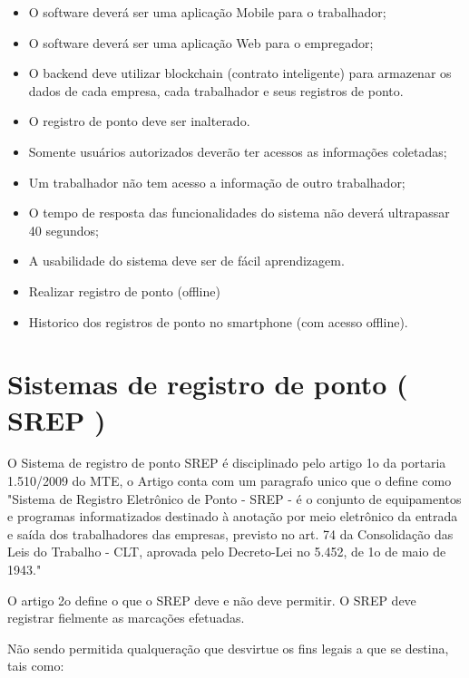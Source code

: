 \documentclass[12pt,openright,twoside,a4paper,english, brazil]{abntex2} %
\begin{document}
\begin{itemize}
	\item O software deverá ser uma aplicação Mobile para o trabalhador;
	\item O software deverá ser uma aplicação Web para o empregador;
	\item O backend deve utilizar blockchain (contrato inteligente) para armazenar os dados de cada empresa, cada trabalhador e seus registros de ponto.
	\item O registro de ponto deve ser inalterado.
	\item Somente usuários autorizados deverão ter acessos as informações coletadas;
	\item Um trabalhador não tem acesso a informação de outro trabalhador;
	\item O tempo de resposta das funcionalidades do sistema não deverá ultrapassar 40 segundos;
	\item A usabilidade do sistema deve ser de fácil aprendizagem.
	\item Realizar registro de ponto (offline)
	\item Historico dos registros de ponto no smartphone (com acesso offline).
\end{itemize}

\section{Sistemas de registro de ponto ( \gls{SREP} )}

O Sistema de registro de ponto \gls{SREP} é disciplinado pelo artigo 1o da portaria 1.510/2009 do \gls{MTE}, o Artigo conta com um paragrafo unico que o define como "Sistema de Registro Eletrônico de Ponto - SREP - é o conjunto de equipamentos e programas informatizados destinado à anotação por meio eletrônico da entrada e saída dos trabalhadores das empresas, previsto no art. 74 da Consolidação das Leis do Trabalho - CLT, aprovada pelo Decreto-Lei no 5.452, de 1o de maio de 1943."

O artigo 2o define o que o SREP deve e não deve permitir. O SREP deve registrar fielmente as marcações efetuadas.

Não sendo permitida qualqueração que desvirtue os fins legais a que se destina, tais como:
\end{document}
